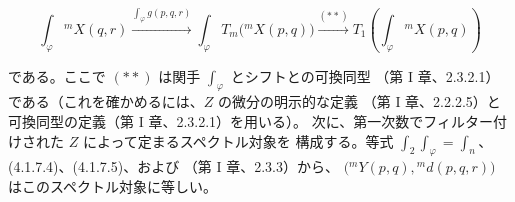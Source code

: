 \begin{equation}
\int_\varphi{}^{m}\!X(q,r)
\xrightarrow{\int_\varphi g(p,q,r)}
\int_\varphi T_m\bigl({}^{m}\!X(p,q)\bigr)
\xrightarrow{(**)}
T_1\left(\int_\varphi{}^{m}\!X(p,q)\right)
\tag{4.1.7.5}
\end{equation}

である。ここで $(**)$ は関手 $\int_\varphi$ とシフトとの可換同型
（第 I 章、2.3.2.1）である（これを確かめるには、$Z$ の微分の明示的な定義
（第 I 章、2.2.2.5）と可換同型の定義（第 I 章、2.3.2.1）を用いる）。
次に、第一次数でフィルター付けされた $Z$ によって定まるスペクトル対象を
構成する。等式 $\int_2\int_\varphi=\int_n$、(4.1.7.4)、(4.1.7.5)、および
（第 I 章、2.3.3）から、
$\bigl({}^{m}\!Y(p,q),{}^{m}\!d(p,q,r)\bigr)$ はこのスペクトル対象に等しい。
\endgroup
